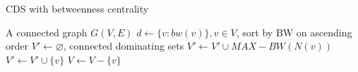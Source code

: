 \documentclass{article}
\let\emptyset\varnothing
\begin{document}

 
\begin{algorithm}
    \begin{algorithmic}%
        \caption{CDS with betweenness centrality} \label{algorithm: cds bw}
        \Require A connected graph $G(V, E)$
        \State $d \gets \{v : bw(v)\}, v \in V$, sort by BW on ascending order
        \State $V' \gets \emptyset$, connected dominating sets
                \State $V' \gets V' \cup MAX-BW(N(v))$      
            \Else
                \State $V' \gets V' \cup \{v\}$
            \EndIf
            \State $V \gets V-\{v\}$
        \EndFor             
    \end{algorithmic}
\end{algorithm}
\end{document}
